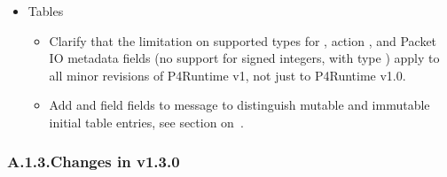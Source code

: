 \documentclass[11pt]{article}
\begin{document}
{\begin{itemize}
\begin{itemize}[noitemsep,topsep=\mdcompacttopsep]
\item{}In message , replaced primitive field 
in a compatible manner with new  containing preferred
new field .%
\end{itemize}%

\item{}
Tables%

\begin{itemize}[noitemsep,topsep=\mdcompacttopsep]%

\item{}Clarify that the limitation on supported types for , action
, and Packet IO metadata fields (no support for signed integers,
with type ) apply to all minor revisions of P4Runtime v1, not just
to P4Runtime v1.0.%

\item{}Add  and  field fields to  message to
distinguish mutable and immutable initial table entries,
see section on~.%
\end{itemize}%
\end{itemize}%

\subsubsection{A.1.3.\hspace*{0.5em}Changes in v1.3.0}\label{sec-changes-in-v130}%

}
\end{document}
